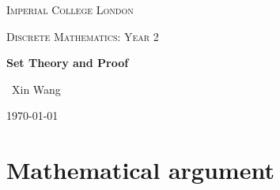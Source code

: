 \documentclass[10pt,a4paper]{article}
\begin{document}

\begin{titlepage}
	\centering
	{\scshape\LARGE Imperial College London \par}
	\vspace{1cm}
    {\scshape\Large Discrete Mathematics: Year 2\par}
    \vspace{1.5cm}
	{\huge\bfseries Set Theory and Proof\par}
	\vspace{2cm}
	{\Large\ Xin Wang }
	\vfill
	{\large \today\par}
\end{titlepage}


\begin{abstract}
    Set Theory is an important language and tool for reasoning. It is the basis of Mathematics and
    Computer Science since Logic is basically Set Theory. It is a useful tool for formalizing and
    reasoning about computations and its objects. \par 

    Proof is the activity of finding and discovering and confirming the truth. This chapter
    discusses how to write down proofs that are able to be communicated effectively. There is a
    balance to proofs between too much detail and too little (being too strict) - just like a sating
    in Italy: "It requires two people to make a good salad dress; a generous person to add oil and a
    mean person to add the vinegar". A tolerant openness and awareness is critical in
    discovering/understanding proofs while a strictness and discipline is required to write it down.
\end{abstract}


\tableofcontents
\pagebreak

\section{Mathematical argument}
\end{document}
